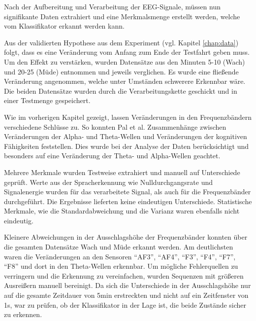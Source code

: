 \label{sec:extraction}
Nach der Aufbereitung und Verarbeitung der EEG-Signale, müssen nun signifikante Daten extrahiert und eine Merkmalsmenge erstellt werden, welche vom Klassifikator erkannt werden kann. 

Aus der validierten Hypothese aus dem Experiment (vgl. Kapitel \ref{chap:data}) folgt, dass es eine Veränderung vom Anfang zum Ende der Testfahrt geben muss. Um den Effekt zu verstärken, wurden Datensätze aus den Minuten 5-10 (Wach) und 20-25 (Müde) entnommen und jeweils verglichen. Es wurde eine fließende Veränderung angenommen, welche unter Umständen schwerere Erkennbar wäre. Die beiden Datensätze wurden durch die Verarbeitungskette geschickt und in einer Testmenge gespeichert. 

Wie im vorherigen Kapitel gezeigt, lassen Veränderungen in den Frequenzbändern verschiedene Schlüsse zu. So konnten Pal et al. \cite{Pal2008} Zusammenhänge zwischen Veränderungen der Alpha- und Theta-Wellen und Veränderungen der kognitiven Fähigkeiten feststellen. Dies wurde bei der Analyse der Daten berücksichtigt und besonders auf eine Veränderung der Theta- und Alpha-Wellen geachtet. 

Mehrere Merkmale wurden Testweise extrahiert und manuell auf Unterschiede geprüft. Werte aus der Spracherkennung wie Nulldurchgangsrate und Signalenergie wurden für das verarbeitete Signal, als auch für die Frequenzbänder durchgeführt. Die Ergebnisse lieferten keine eindeutigen Unterschiede. Statistische Merkmale, wie die Standardabweichung und die Varianz waren ebenfalls nicht eindeutig. 

Kleinere Abweichungen in der Ausschlagshöhe der Frequenzbänder konnten über die gesamten Datensätze Wach und Müde erkannt werden. Am deutlichsten waren die Veränderungen an den Sensoren "`AF3"', "`AF4"', "`F3"', "`F4"', "`F7"', "`F8"' und dort in den Theta-Wellen erkennbar. Um mögliche Fehlerquellen zu verringern und die Erkennung zu vereinfachen, wurden Sequenzen mit größeren Ausreißern manuell bereinigt. Da sich die Unterschiede in der Ausschlagshöhe nur auf die gesamte Zeitdauer von 5min erstreckten und nicht auf ein Zeitfenster von 1s, war zu prüfen, ob der Klassifikator in der Lage ist, die beide Zustände sicher zu erkennen.